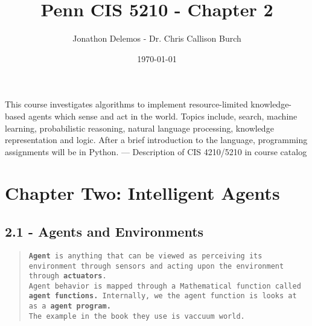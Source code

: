 \documentclass{article}
\title{Penn CIS 5210 - Chapter 2}
\author{Jonathon Delemos - Dr. Chris Callison Burch}
\date{\today}
\begin{document}
\maketitle

This course investigates algorithms to implement resource-limited knowledge-based agents which
sense and act in the world. Topics include, search, machine learning, probabilistic reasoning, natural
language processing, knowledge representation and logic. After a brief introduction to the language,
programming assignments will be in Python.
— Description of CIS 4210/5210 in course catalog

\section{Chapter Two: Intelligent Agents}
\subsection{2.1 - Agents and Environments}
\begin{quote}
    \texttt{\textbf{Agent} is anything that can be viewed as perceiving its environment through sensors and acting upon the environment through \textbf{actuators}.
        \\ Agent behavior is mapped through a Mathematical function called \textbf{agent functions.} Internally, we the agent function is looks at as a \textbf{agent program.}
        \\The example in the book they use is vaccuum world.}
\end{quote}
\end{document}
